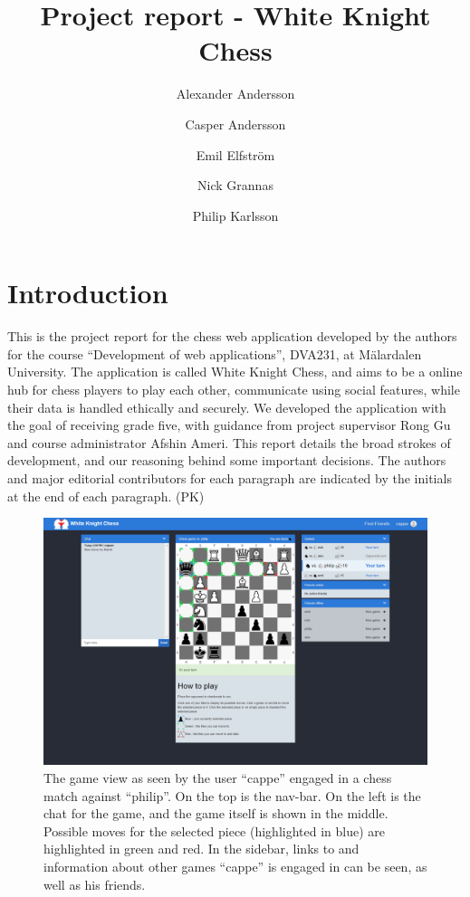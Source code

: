 \documentclass[acmlarge, review=false, screen=true]{acmart}
\begin{document}
\title{Project report - White Knight Chess}

\author{Alexander Andersson}
\author{Casper Andersson}
\author{Emil Elfström}
\author{Nick Grannas}
\author{Philip Karlsson}




\maketitle

\section{Introduction}
This is the project report for the chess web application developed by the authors for the course “Development of web applications”, DVA231, at Mälardalen University. The application is called White Knight Chess, and aims to be a online hub for chess players to play each other, communicate using social features, while their data is handled ethically and securely. We developed the application with the goal of receiving grade five, with guidance from project supervisor Rong Gu and course administrator Afshin Ameri. This report details the broad strokes of development, and our reasoning behind some important decisions. The authors and major editorial contributors for each paragraph are indicated by the initials at the end of each paragraph. (PK)

\begin{figure}
  \includegraphics[width=\textwidth]{images/screenshot-of-WKC.png}
  \caption{The game view as seen by the user “cappe” engaged in a chess match against “philip”. On the top is the nav-bar. On the left is the chat for the game, and the game itself is shown in the middle. Possible moves for the selected piece (highlighted in blue) are highlighted in green and red. In the sidebar, links to and information about other games “cappe” is engaged in can be seen, as well as his friends.
  }
  \label{fig:game-view}
\end{figure}
\end{document}
